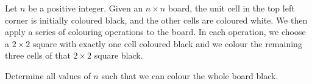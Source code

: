 Let $n$ be a positive integer. Given an $n \times n$ board, the unit cell in the top left corner is initially coloured black, and the other cells are coloured white. We then apply a series of colouring operations to the board. In each operation, we choose a $2 \times 2$ square with exactly one cell coloured black and we colour the remaining three cells of that $2 \times 2$ square black.

Determine all values of $n$ such that we can colour the whole board black.
